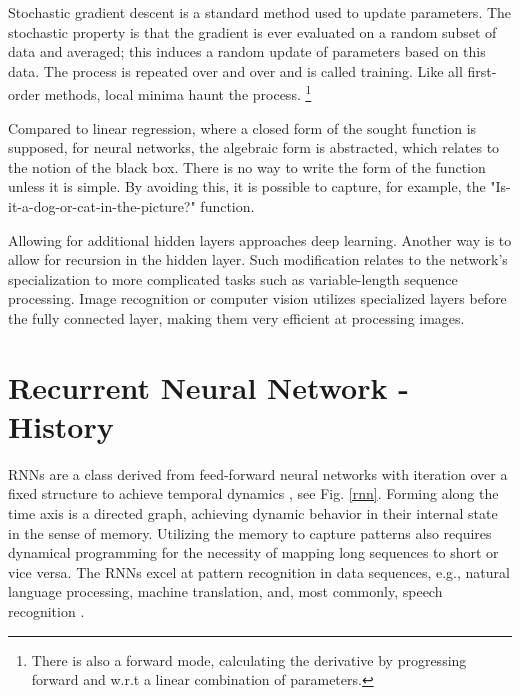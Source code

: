 Stochastic gradient descent is a standard method used to update parameters. The stochastic property is that the gradient is ever evaluated on a random subset of data and averaged; this induces a random update of parameters based on this data. The process is repeated over and over and is called training. Like all first-order methods, local minima haunt the process. \footnote{There is also a forward mode, calculating the derivative by progressing forward and w.r.t a linear combination of parameters.}

Compared to linear regression, where a closed form of the sought function is supposed, for neural networks, the algebraic form is abstracted, which relates to the notion of the black box. There is no way to write the form of the function unless it is simple. By avoiding this, it is possible to capture, for example, the "Is-it-a-dog-or-cat-in-the-picture?" function.

Allowing for additional hidden layers approaches deep learning. Another way is to allow for recursion in the hidden layer. Such modification relates to the network's specialization to more complicated tasks such as variable-length sequence processing. Image recognition or computer vision utilizes specialized layers before the fully connected layer, making them very efficient at processing images.


\section{Recurrent Neural Network - History}

RNNs are a class derived from feed-forward neural networks with iteration over a fixed structure to achieve temporal dynamics \cite{DRNNS}, see Fig. \ref{rnn}. Forming along the time axis is a directed graph, achieving dynamic behavior in their internal state in the sense of memory. Utilizing the memory to capture patterns also requires dynamical programming for the necessity of mapping long sequences to short or vice versa. The RNNs excel at pattern recognition in data sequences, e.g., natural language processing, machine translation, and, most commonly, speech recognition \cite{handwriting}. 

